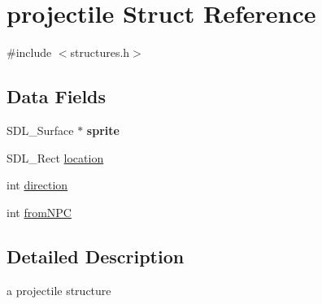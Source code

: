 \hypertarget{structprojectile}{\section{projectile Struct Reference}
\label{structprojectile}
}


{\ttfamily \#include $<$structures.\-h$>$}

\subsection*{Data Fields}
\begin{DoxyCompactItemize}
\item 
\hypertarget{structprojectile_a1c7252614a33238e51edd3bbd5fa08c5}{S\-D\-L\-\_\-\-Surface $\ast$ {\bfseries sprite}}\label{structprojectile_a1c7252614a33238e51edd3bbd5fa08c5}

\item 
S\-D\-L\-\_\-\-Rect \hyperlink{structprojectile_a08e7ab1c2395b84bea7ca13eb99bac60}{location}
\item 
int \hyperlink{structprojectile_a886d551d5381dc3e53f17825ffc51641}{direction}
\item 
int \hyperlink{structprojectile_a130dff78b354d57d5b6dadcad3e597ef}{from\-N\-P\-C}
\end{DoxyCompactItemize}


\subsection{Detailed Description}
a projectile structure 

